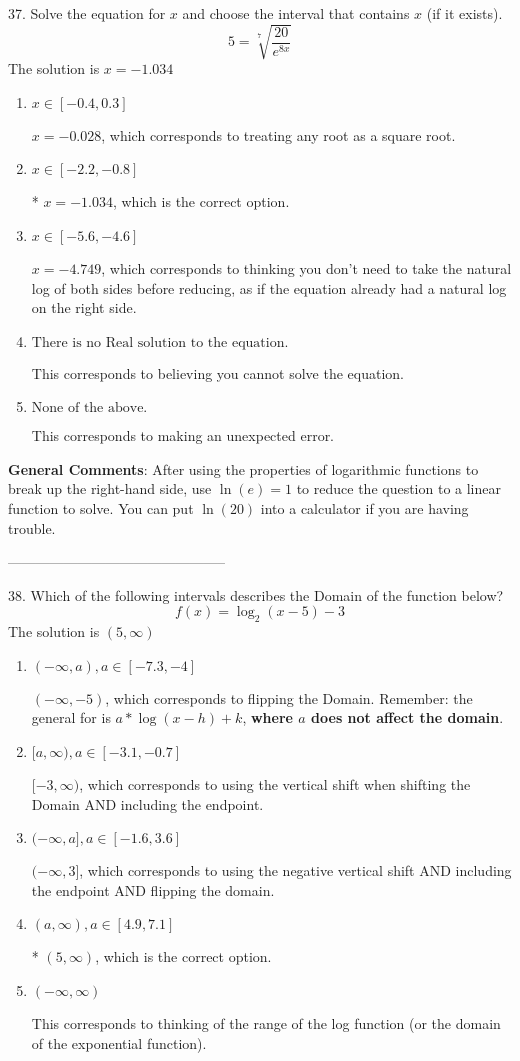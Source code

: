 \documentclass{article}[14pt]
\begin{document}
37.  Solve the equation for $x$ and choose the interval that contains $x$ (if it exists).
$$  5 = \sqrt[7]{\frac{20}{e^{8x}}} $$ 
The solution is $ x = -1.034 $ 

\begin{enumerate}[label=\Alph*.] 
\item $ x \in [-0.4, 0.3] $ 

 $x = -0.028$, which corresponds to treating any root as a square root. 
\item $ x \in [-2.2, -0.8] $ 

 * $x = -1.034$, which is the correct option. 
\item $ x \in [-5.6, -4.6] $ 

 $x = -4.749$, which corresponds to thinking you don't need to take the natural log of both sides before reducing, as if the equation already had a natural log on the right side. 
\item $ \text{There is no Real solution to the equation.} $ 

 This corresponds to believing you cannot solve the equation. 
\item $ \text{None of the above.} $ 

 This corresponds to making an unexpected error. 
\end{enumerate} 
 
\textbf{General Comments}: After using the properties of logarithmic functions to break up the right-hand side, use $\ln(e) = 1$ to reduce the question to a linear function to solve. You can put $\ln(20)$ into a calculator if you are having trouble.

-----------------------------------------------

38. Which of the following intervals describes the Domain of the function below?
$$ f(x) = \log_2{(x-5)}-3 $$ 
The solution is $ (5, \infty) $ 

\begin{enumerate}[label=\Alph*.] 
\item $ (-\infty, a), a \in [-7.3, -4] $ 

 $(-\infty, -5)$, which corresponds to flipping the Domain. Remember: the general for is $a*\log(x-h)+k$, \textbf{where $a$ does not affect the domain}. 
\item $ [a, \infty), a \in [-3.1, -0.7] $ 

 $[-3, \infty)$, which corresponds to using the vertical shift when shifting the Domain AND including the endpoint. 
\item $ (-\infty, a], a \in [-1.6, 3.6] $ 

 $(-\infty, 3]$, which corresponds to using the negative vertical shift AND including the endpoint AND flipping the domain. 
\item $ (a, \infty), a \in [4.9, 7.1] $ 

 * $(5, \infty)$, which is the correct option. 
\item $ (-\infty, \infty) $ 

 This corresponds to thinking of the range of the log function (or the domain of the exponential function). 
\end{enumerate} 
 
\end{document}
